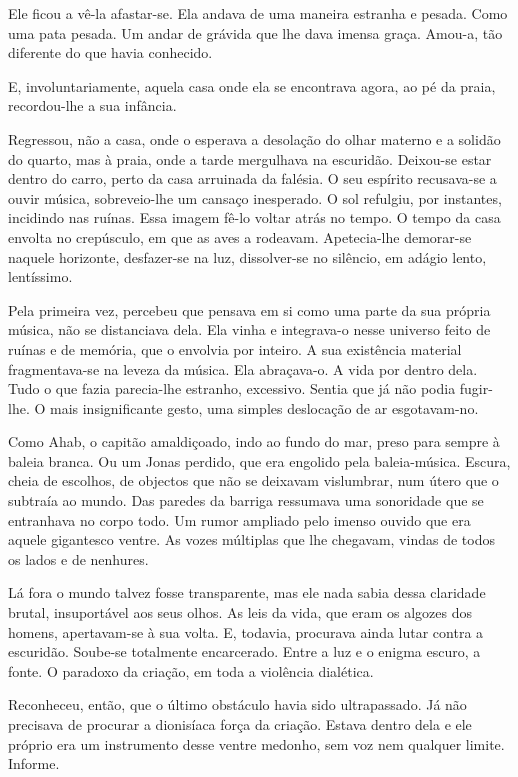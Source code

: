 Ele ficou a vê-la afastar-se. Ela andava de uma maneira estranha e
pesada. Como uma pata pesada. Um andar de grávida que lhe dava imensa
graça. Amou-a, tão diferente do que havia conhecido.

E, involuntariamente, aquela casa onde ela se encontrava agora, ao pé da
praia, recordou-lhe a sua infância.

Regressou, não a casa, onde o esperava a desolação do olhar materno e a
solidão do quarto, mas à praia, onde a tarde mergulhava na escuridão.
Deixou-se estar dentro do carro, perto da casa arruinada da falésia. O
seu espírito recusava-se a ouvir música, sobreveio-lhe um cansaço
inesperado. O sol refulgiu, por instantes, incidindo nas ruínas. Essa
imagem fê-lo voltar atrás no tempo. O tempo da casa envolta no
crepúsculo, em que as aves a rodeavam. Apetecia-lhe demorar-se naquele
horizonte, desfazer-se na luz, dissolver-se no silêncio, em adágio
lento, lentíssimo.

Pela primeira vez, percebeu que pensava em si como uma parte da sua
própria música, não se distanciava dela. Ela vinha e integrava-o nesse
universo feito de ruínas e de memória, que o envolvia por inteiro. A sua
existência material fragmentava-se na leveza da música. Ela abraçava-o.
A vida por dentro dela. Tudo o que fazia parecia-lhe estranho,
excessivo. Sentia que já não podia fugir-lhe. O mais insignificante
gesto, uma simples deslocação de ar esgotavam-no.

Como Ahab, o capitão amaldiçoado, indo ao fundo do mar, preso para
sempre à baleia branca. Ou um Jonas perdido, que era engolido pela
baleia-música. Escura, cheia de escolhos, de objectos que não se
deixavam vislumbrar, num útero que o subtraía ao mundo. Das paredes da
barriga ressumava uma sonoridade que se entranhava no corpo todo. Um
rumor ampliado pelo imenso ouvido que era aquele gigantesco ventre. As
vozes múltiplas que lhe chegavam, vindas de todos os lados e de
nenhures.

Lá fora o mundo talvez fosse transparente, mas ele nada sabia dessa
claridade brutal, insuportável aos seus olhos. As leis da vida, que eram
os algozes dos homens, apertavam-se à sua volta. E, todavia, procurava
ainda lutar contra a escuridão. Soube-se totalmente encarcerado. Entre a
luz e o enigma escuro, a fonte. O paradoxo da criação, em toda a
violência dialética.

Reconheceu, então, que o último obstáculo havia sido ultrapassado. Já
não precisava de procurar a dionisíaca força da criação. Estava dentro
dela e ele próprio era um instrumento desse ventre medonho, sem voz nem
qualquer limite. Informe.

